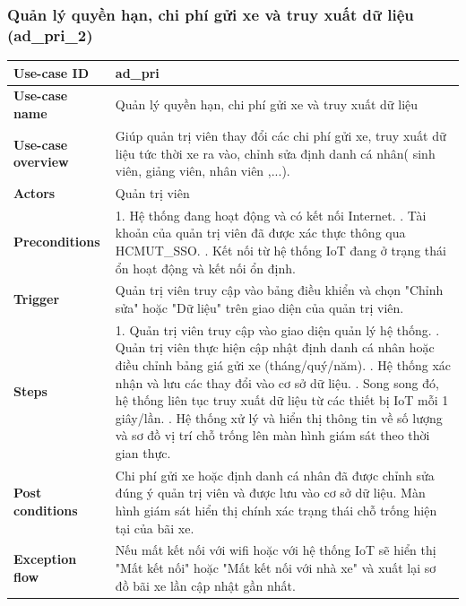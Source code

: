 \subsubsection{Quản lý quyền hạn, chi phí gửi xe và truy xuất dữ liệu (ad\_pri\_2)}
\begingroup
\small
\begin{longtable}{|>{\centering\arraybackslash}m{3cm}|m{13.7cm}|}
\hline
\textbf{Use-case ID} & ad\_pri \\ \hline
\textbf{Use-case name} & Quản lý quyền hạn, chi phí gửi xe và truy xuất dữ liệu \\ \hline
\textbf{Use-case overview} & Giúp quản trị viên thay đổi các chi phí gửi xe, truy xuất dữ liệu tức thời xe ra vào, chỉnh sửa định danh cá nhân( sinh viên, giảng viên, nhân viên ,...). \\ \hline
\textbf{Actors} & Quản trị viên \\ \hline
\textbf{Preconditions} & 
1. Hệ thống đang hoạt động và có kết nối Internet. \newline
2. Tài khoản của quản trị viên đã được xác thực thông qua HCMUT\_SSO. \newline
3. Kết nối từ hệ thống IoT đang ở trạng thái ổn hoạt động và kết nối ổn định. \\ \hline
\textbf{Trigger} & Quản trị viên truy cập vào bảng điều khiển và chọn "Chỉnh sửa" hoặc "Dữ liệu" trên giao diện của quản trị viên. \\ \hline
\textbf{Steps} & 
1. Quản trị viên truy cập vào giao diện quản lý hệ thống. \newline
2. Quản trị viên thực hiện cập nhật định danh cá nhân hoặc điều chỉnh bảng giá gửi xe (tháng/quý/năm). \newline
3. Hệ thống xác nhận và lưu các thay đổi vào cơ sở dữ liệu. \newline
4. Song song đó, hệ thống liên tục truy xuất dữ liệu từ các thiết bị IoT mỗi 1 giây/lần. \newline
5. Hệ thống xử lý và hiển thị thông tin về số lượng và sơ đồ vị trí chỗ trống lên màn hình giám sát theo thời gian thực.\\ \hline
\textbf{Post conditions} & Chi phí gửi xe hoặc định danh cá nhân đã được chỉnh sửa đúng ý quản trị viên và được lưu vào cơ sở dữ liệu. Màn hình giám sát hiển thị chính xác trạng thái chỗ trống hiện tại của bãi xe.\\ \hline
\textbf{Exception flow} & Nếu mất kết nối với wifi hoặc với hệ thống IoT sẽ hiển thị "Mất kết nối" hoặc "Mất kết nối với nhà xe" và xuất lại sơ đồ bãi xe lần cập nhật gần nhất. \\ \hline
\end{longtable}
\endgroup

